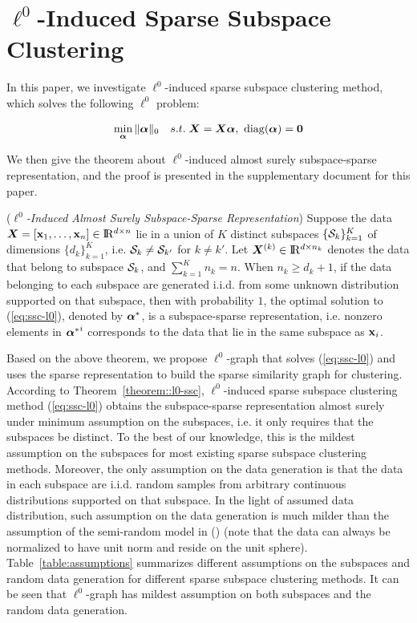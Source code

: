 \documentclass[10pt,twocolumn,letterpaper]{article}
\begin{document}
\section{$\ell^{0}$-Induced Sparse Subspace Clustering}
In this paper, we investigate $\ell^{0}$-induced sparse subspace clustering method, which solves the following $\ell^{0}$ problem:
\begin{small}\begin{align}\label{eq:ssc-l0}
\mathop {\min }\limits_{{\bm{\alpha}}} {\| {{\bm{\alpha}}} \|_0}\quad s.t.\;{\bm X} = {{\bm X}}{\bm{\alpha}},\,\, {\rm diag}(\bm{\alpha}) = \mathbf 0
\end{align}\end{small}
We then give the theorem about $\ell^{0}$-induced almost surely subspace-sparse representation, and the proof is presented in the supplementary document for this paper.
\begin{MyTheorem}\label{theorem::l0-ssc}
(\textit{$\ell^{0}$-Induced Almost Surely Subspace-Sparse Representation})
Suppose the data ${\bm X}=[ {{\mathbf{x}_1},\ldots ,{\mathbf{x}_n}} ] \in {{\rm I}\kern-0.18em{\rm R}^{d \times n}}$ lie in a union of $K$ distinct subspaces $\{\mathcal{S}_k\}_{k=1}^K$ of dimensions $\{d_k\}_{k=1}^K$, i.e. $\mathcal{S}_k \neq \mathcal{S}_{k'}$ for $k \neq k'$. Let $\bm X^{(k)} \in {\rm I}\kern-0.18em{\rm R}^{d \times n_k}$ denotes the data that belong to subspace $\mathcal{S}_k$, and $\sum\limits_{k=1}^K n_k = n$. When $n_k \ge d_k+1$, if the data belonging to each subspace are generated i.i.d. from some unknown distribution supported on that subspace, then with probability $1$, the optimal solution to (\ref{eq:ssc-l0}), denoted by $\bm{\alpha}^*$, is a subspace-sparse representation, i.e. nonzero elements in ${\bm{\alpha}^*}^i$ corresponds to the data that lie in the same subspace as $\mathbf{x}_i$.
\end{MyTheorem}
Based on the above theorem, we propose $\ell^{0}$-graph that solves (\ref{eq:ssc-l0}) and uses the sparse representation to build the sparse similarity graph for clustering. According to Theorem~\ref{theorem::l0-ssc}, $\ell^{0}$-induced sparse subspace clustering method (\ref{eq:ssc-l0}) obtains the subspace-sparse representation almost surely under minimum assumption on the subspaces, i.e. it only requires that the subspaces be distinct. To the best of our knowledge, this is the mildest assumption on the subspaces for most existing sparse subspace clustering methods. Moreover, the only assumption on the data generation is that the data in each subspace are i.i.d. random samples from arbitrary continuous distributions supported on that subspace. In the light of assumed data distribution, such assumption on the data generation is much milder than the assumption of the semi-random model in (\cite{ParkCS14,Wang13,Soltanolkotabi2012}) (note that the data can always be normalized to have unit norm and reside on the unit sphere).  Table~\ref{table:assumptions} summarizes different assumptions on the subspaces and random data generation for different sparse subspace clustering methods. It can be seen that $\ell^{0}$-graph has mildest assumption on both subspaces and the random data generation.
\end{document}
